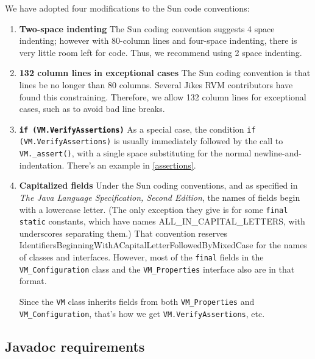 We have adopted four modifications to the Sun code conventions:
\begin{enumerate}
\item {\bf Two-space indenting} The Sun coding convention suggests 4
space indenting; however with 80-column lines and four-space indenting,
there is very little room left for code.  Thus, we recommend using 2
space indenting.

\item {\bf 132 column lines in exceptional cases} The Sun coding convention is
that lines be no longer than 80 columns.  Several Jikes RVM
contributors have found this constraining.  Therefore, we allow 132
column lines for exceptional cases, such as to avoid bad line breaks.

\item {\bf \tt if (VM.VerifyAssertions)}
As a special case, the condition {\tt if (VM.VerifyAssertions)} is
usually immediately followed by the call to {\tt VM.\_assert()},
with a single space substituting for the normal
newline-and-indentation.  There's an example in \ref{assertions}.    

\item {\bf Capitalized fields} 
Under the Sun coding conventions, and as specified in 
{\em The Java Language Specification, Second Edition}, the names of
fields begin with a lowercase letter.  (The only exception they give
is for some {\tt final static} constants, which have names
ALL\_IN\_CAPITAL\_LETTERS, with underscores separating them.)  That
convention reserves
IdentifiersBeginningWithACapitalLetterFollowedByMixedCase for the
names of classes and interfaces.  However, most of the {\tt final}
fields in the {\tt VM\_Configuration} class and the {\tt VM\_\-Pro\-per\-ties}
interface also are in that format.   

Since the {\tt VM} class inherits
fields from both {\tt VM\_Properties} and {\tt VM\_Configuration},
that's how we get {\tt VM.VerifyAssertions}, etc.
%

\end{enumerate}

\JikesTMFooter

\JavaTMFooter

\subsection {Javadoc requirements}


